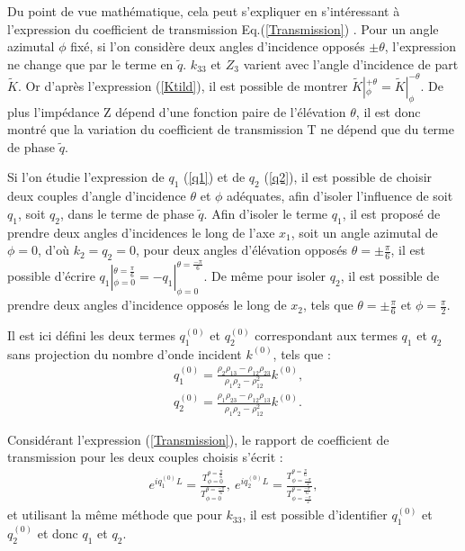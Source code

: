 \documentclass[twoside,openright]{report}
\begin{document}
    Du point de vue mathématique, cela peut s'expliquer en s'intéressant à l'expression du coefficient de transmission Eq.(\ref{Transmission}) . Pour un angle azimutal $\phi$ fixé, si l'on considère deux angles d'incidence opposés $\pm \theta$, l'expression ne change que par le terme en $\tilde{q}$. $k_{33}$ et $Z_3$ varient avec l'angle d'incidence de part $\tilde{K}$. Or d'après l'expression (\ref{Ktild}), il est possible de montrer $\tilde{K}|^{+\theta}_{\phi}=\tilde{K}|^{-\theta}_{\phi}$. De plus l'impédance Z dépend d'une fonction paire de l'élévation $\theta$, il est donc montré que la variation du coefficient de transmission T ne dépend que du terme de phase $\tilde{q}$.
    
    Si l'on étudie l'expression de $q_1$ (\ref{q1}) et de $q_2$ (\ref{q2}), il est possible de choisir deux couples d'angle d'incidence $\theta$ et $\phi$ adéquates, afin d'isoler l'influence de soit $q_1$, soit $q_2$, dans le terme de phase $\tilde{q}$. Afin d'isoler le terme $q_1$, il est proposé de prendre deux angles d'incidences le long de l'axe $x_1$, soit un angle azimutal de $\phi=0$, d'où $k_2=q_2=0$, pour deux angles d'élévation opposés $\theta=\pm \frac{\pi}{6}$, il est possible d'écrire $q_1|^{\theta=\frac{\pi}{6}}_{\phi=0}=-q_1|^{\theta=\frac{-\pi}{6}}_{\phi=0}$. De même pour isoler $q_2$, il est possible de prendre deux angles d'incidence opposés le long de $x_2$, tels que $\theta=\pm \frac{\pi}{6}$ et $\phi=\frac{\pi}{2}$.
    
    Il est ici défini les deux termes $q_1^{(0)}$ et $q_2^{(0)}$ correspondant aux termes $q_1$ et $q_2$ sans projection du nombre d'onde incident $k^{(0)}$, tels que :
    \begin{align}
            &q_1^{(0)}=\frac{\rho_2\rho_{13}-\rho_{12}\rho_{23}}{\rho_1\rho_2-\rho_{12}^2}k^{(0)},\label{q1,0}\\
        &q_2^{(0)}=\frac{\rho_1\rho_{23}-\rho_{12}\rho_{13}}{\rho_1\rho_2-\rho_{12}^2}k^{(0)}.\label{q2,0}
    \end{align}
    
    Considérant l'expression (\ref{Transmission}), le rapport de coefficient de transmission pour les deux couples choisis s'écrit :
    \begin{align}
     e^{iq_1^{(0)}L}=\frac{T^{\theta=\frac{\pi}{6}}_{\phi=0}}{T^{\theta=\frac{-\pi}{6}}_{\phi=0}},\ e^{iq_2^{(0)}L}=\frac{T^{\theta=\frac{\pi}{6}}_{\phi=\frac{-\pi}{2}}}{T^{\theta=\frac{-\pi}{6}}_{\phi=\frac{-\pi}{2}}},
    \end{align}
    et utilisant la même méthode que pour $k_{33}$, il est possible d'identifier $q_1^{(0)}$ et $q_2^{(0)}$ et donc $q_1$ et $q_2$.
    
\end{document}
